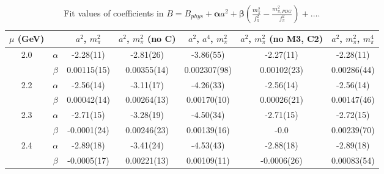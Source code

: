 \documentclass[12pt]{extarticle}
\begin{document}
\begin{table}[h!]
\begin{center}
\begin{tabular}{|c c|c|c|c|c|c|}
\hline
$\mu$ (GeV) &  & $a^2$, $m_\pi^2$& $a^2$, $m_\pi^2$ (no C)& $a^2$, $a^4$, $m_\pi^2$& $a^2$, $m_\pi^2$ (no M3, C2)& $a^2$, $m_\pi^2$, $m_\pi^4$\\
\hline
\multirow{2}{0.5in}{2.0} & $\alpha$ & -2.28(11)& -2.81(26)& -3.86(55)& -2.27(11)& -2.28(11)\\
 & $\beta$ & 0.00115(15)& 0.00355(14)& 0.002307(98)& 0.00102(23)& 0.00286(44)\\
\hline
\multirow{2}{0.5in}{2.2} & $\alpha$ & -2.56(14)& -3.11(17)& -4.26(33)& -2.56(14)& -2.56(14)\\
 & $\beta$ & 0.00042(14)& 0.00264(13)& 0.00170(10)& 0.00026(21)& 0.00147(46)\\
\hline
\multirow{2}{0.5in}{2.3} & $\alpha$ & -2.71(15)& -3.28(19)& -4.50(34)& -2.71(15)& -2.72(15)\\
 & $\beta$ & -0.0001(24)& 0.00246(23)& 0.00139(16)& -0.0& 0.00239(70)\\
\hline
\multirow{2}{0.5in}{2.4} & $\alpha$ & -2.89(18)& -3.41(24)& -4.53(43)& -2.88(18)& -2.89(18)\\
 & $\beta$ & -0.0005(17)& 0.00221(13)& 0.00109(11)& -0.0006(26)& 0.00083(54)\\
\hline
\end{tabular}
\caption{Fit values of coefficients in $B = B_{phys} + \mathbf{\alpha} a^2 + \mathbf{\beta}\left(\frac{m_\pi^2}{f_\pi^2}-\frac{m_{\pi,PDG}^2}{f_\pi^2}\right) + \ldots$.}
\end{center}
\end{table}




















\clearpage
\end{document}

